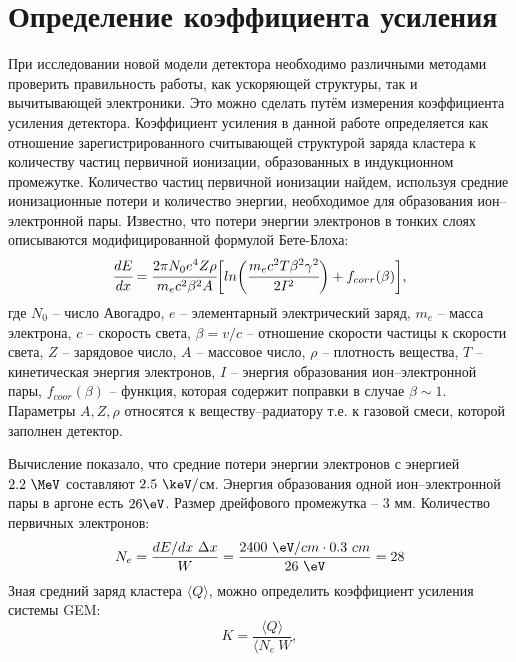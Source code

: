 \section{Определение коэффициента усиления}
При исследовании новой модели детектора необходимо различными методами проверить правильность работы, как ускоряющей структуры, так и вычитывающей электроники. Это можно сделать путём измерения коэффициента усиления детектора. 
Коэффициент усиления в данной работе определяется как отношение зарегистрированного считывающей структурой заряда кластера к количеству частиц первичной ионизации, образованных в индукционном промежутке. 
Количество частиц первичной ионизации найдем, используя средние ионизационные потери и количество энергии, необходимое для образования ион--электронной пары. Известно, что потери энергии электронов в тонких слоях описываются модифицированной формулой Бете-Блоха:
\begin{equation}
\cfrac{dE}{dx} = \cfrac{2\pi N_0 e^4 Z\rho}{m_e c^2 \beta^2 A}\biggl[ln \bigg(\cfrac{ m_ec^2T\beta^2\gamma^2}{2I^2}\bigg) + f_{corr}(\beta)\biggr],
\label{eq:Bethe_Bloch}
\end{equation}
где $N_0$ -- число Авогадро, $e$ -- элементарный электрический заряд, $m_e$ -- масса электрона, $c$ -- скорость света, $\beta = v/c$ -- отношение скорости частицы к скорости света, $Z$ -- зарядовое число, $A$ -- массовое число, $\rho$ -- плотность вещества, $T$ -- кинетическая энергия электронов, $I$ -- энергия образования ион--электронной пары, $f_{coor}(\beta)$ -- функция, которая содержит поправки в случае $\beta \sim 1$. Параметры $A,Z,\rho$ относятся к веществу--радиатору т.е. к газовой смеси, которой заполнен детектор.
\par Вычисление показало, что средние потери энергии электронов с энергией $2.2~\MeV$ составляют $2.5~\keV/$см. Энергия образования одной ион--электронной пары в аргоне есть $26\eV$. Размер дрейфового промежутка -- 3 мм. Количество первичных электронов:
\begin{equation}
	N_e = \frac{dE/dx~\Delta x}{W} =\frac {2400~\eV/cm \cdot 0.3~cm}{26~\eV} = 28
\end{equation}
Зная средний заряд кластера $\langle Q\rangle$, можно определить коэффициент усиления системы GEM: 
\begin{equation}
K = \frac{\langle Q\rangle}{\langle N_e \ W},
\end{equation}
